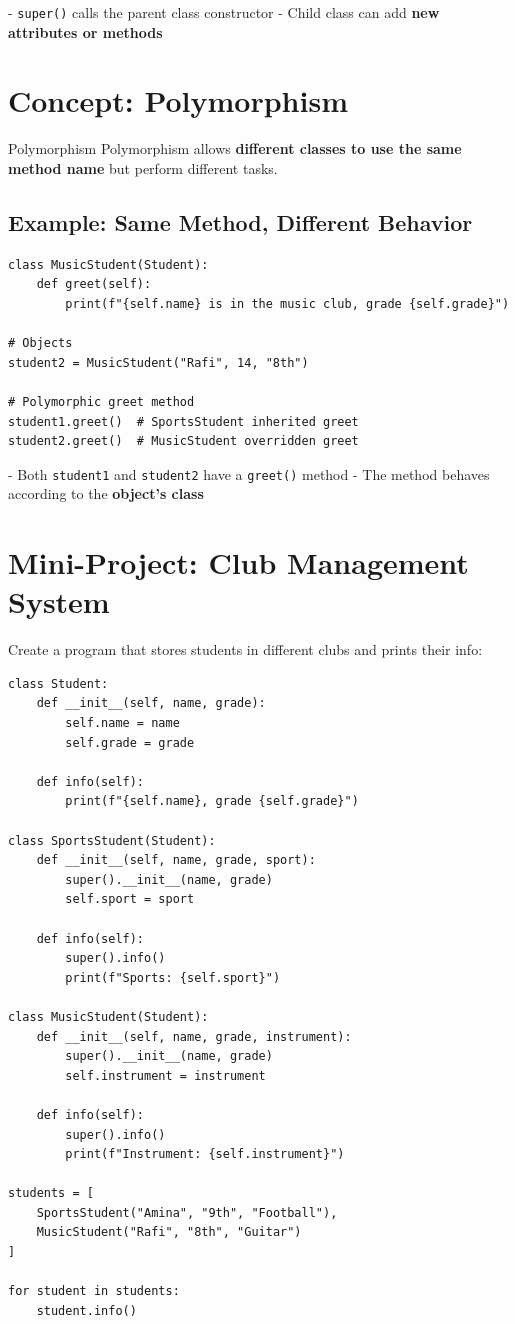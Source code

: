 - \texttt{super()} calls the parent class constructor  
- Child class can add \textbf{new attributes or methods}  

\section{Concept: Polymorphism}

\begin{definition}{Polymorphism}
Polymorphism allows \textbf{different classes to use the same method name} but perform different tasks.
\end{definition}

\subsection{Example: Same Method, Different Behavior}

\begin{verbatim}
class MusicStudent(Student):
    def greet(self):
        print(f"{self.name} is in the music club, grade {self.grade}")

# Objects
student2 = MusicStudent("Rafi", 14, "8th")

# Polymorphic greet method
student1.greet()  # SportsStudent inherited greet
student2.greet()  # MusicStudent overridden greet
\end{verbatim}

- Both \texttt{student1} and \texttt{student2} have a \texttt{greet()} method  
- The method behaves according to the \textbf{object’s class}

\section{Mini-Project: Club Management System}

Create a program that stores students in different clubs and prints their info:

\begin{verbatim}
class Student:
    def __init__(self, name, grade):
        self.name = name
        self.grade = grade

    def info(self):
        print(f"{self.name}, grade {self.grade}")

class SportsStudent(Student):
    def __init__(self, name, grade, sport):
        super().__init__(name, grade)
        self.sport = sport

    def info(self):
        super().info()
        print(f"Sports: {self.sport}")

class MusicStudent(Student):
    def __init__(self, name, grade, instrument):
        super().__init__(name, grade)
        self.instrument = instrument

    def info(self):
        super().info()
        print(f"Instrument: {self.instrument}")

students = [
    SportsStudent("Amina", "9th", "Football"),
    MusicStudent("Rafi", "8th", "Guitar")
]

for student in students:
    student.info()
\end{verbatim}

